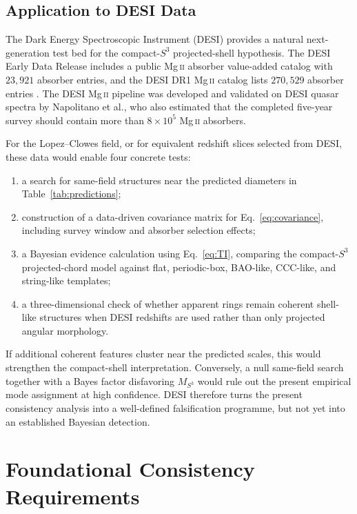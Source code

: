 \documentclass[
  aps,
  prd,
  reprint,
  superscriptaddress,
  nofootinbib,
  longbibliography,
  floatfix,
  amsmath,
  amssymb
]{revtex4-2}
\theoremstyle{plain}
\theoremstyle{definition}
\theoremstyle{remark}
\begin{document}
\subsection{Application to DESI Data}
\label{subsec:desi}

The Dark Energy Spectroscopic Instrument (DESI) provides a natural
next-generation test bed for the compact-$S^3$ projected-shell
hypothesis. The DESI Early Data Release includes a public Mg\,\textsc{ii}
absorber value-added catalog with $23{,}921$ absorber entries, and the
DESI DR1 Mg\,\textsc{ii} catalog lists $270{,}529$ absorber entries
\cite{DESIMgIIEDR,DESIMgIIDR1}. The DESI Mg\,\textsc{ii} pipeline was
developed and validated on DESI quasar spectra by Napolitano et al., who
also estimated that the completed five-year survey should contain more
than $8\times10^5$ Mg\,\textsc{ii} absorbers\cite{Napolitano2023}.

For the Lopez--Clowes field, or for equivalent redshift slices selected
from DESI, these data would enable four concrete tests:
\begin{enumerate}[label=(\roman*),noitemsep]
\item a search for same-field structures near the predicted diameters in
  Table~\ref{tab:predictions};
\item construction of a data-driven covariance matrix for
  Eq.~\eqref{eq:covariance}, including survey window and absorber
  selection effects;
\item a Bayesian evidence calculation using Eq.~\eqref{eq:TI}, comparing
  the compact-$S^3$ projected-chord model against flat, periodic-box,
  BAO-like, CCC-like, and string-like templates;
\item a three-dimensional check of whether apparent rings remain
  coherent shell-like structures when DESI redshifts are used rather
  than only projected angular morphology.
\end{enumerate}
If additional coherent features cluster near the predicted scales, this
would strengthen the compact-shell interpretation. Conversely, a null
same-field search together with a Bayes factor disfavoring
$M_{S^3}$ would rule out the present empirical mode assignment at high
confidence. DESI therefore turns the present consistency analysis into a
well-defined falsification programme, but not yet into an established
Bayesian detection.



\section{Foundational Consistency Requirements}
\label{sec:foundations}
\end{document}
